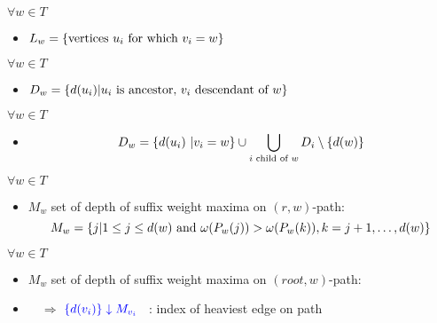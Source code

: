 \documentclass[18pt]{beamer}
\begin{document}
\begin{frame}
\begin{figure}
	\end{figure}

            \begin{overprint}
            	$\forall w \in T$
            	\begin{itemize}
            	\item $L_w = \{\textup{vertices }u_i \textup{ for which } v_i = w\}$
            	\end{itemize}
           		 $\forall w \in T$
           		 \begin{itemize}
            		\item $D_w = \{d(u_i) | u_i \textup{ is ancestor, } v_i \textup{ descendant of } w\}$
            	\end{itemize}
                $\forall w \in T$
                \begin{itemize}
                	\item \[D_w = \{d(u_i) \ | v_i = w\} \cup \bigcup_{i \textup{ child of } w } D_i \setminus \{d(w)\}\]
                \end{itemize}
            	$\forall w \in T$
            	\begin{itemize}
           		\item $M_w$ set of depth of suffix weight maxima on $(r,w)$-path:
           		\[
           		M_w = \{j | 1 \le j \le d(w) \textup{ and } \omega(P_w(j)) > \omega(P_w(k)), k = j+1, \dots, d(w)\}
           		\]
           		\end{itemize}
           	    $\forall w \in T$
           	    \begin{itemize}
           	    	\item $M_w$ set of depth of suffix weight maxima on $(root,w)$-path:
           	    	\item [] \ \ $\Rightarrow$ $\color{blue}\{d(v_i)\} \downarrow M_{v_i}$ \ : index of heaviest edge on path

\end{itemize}
\end{overprint}
\end{frame}
\end{document}
